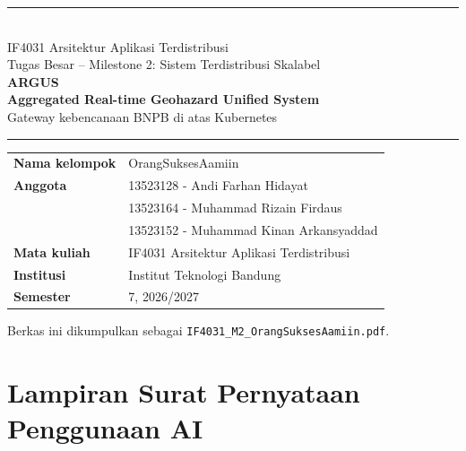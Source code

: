 \documentclass[11pt,a4paper,oneside]{report}
\begin{document}
\begin{titlepage}
\thispagestyle{empty}
\sffamily
\vspace*{1.2cm}
{\color{accent}\rule{\textwidth}{1.6pt}}\\[1.2em]
{\Large IF4031 Arsitektur Aplikasi Terdistribusi}\\[0.4em]
{\large Tugas Besar -- Milestone 2: Sistem Terdistribusi Skalabel}\\[2.2em]
{\fontsize{40}{44}\selectfont\bfseries\color{accent} ARGUS}\\[0.5em]
{\Large\bfseries Aggregated Real-time Geohazard Unified System}\\[0.8em]
{\large Gateway kebencanaan BNPB di atas Kubernetes}\\[1.2em]
{\color{accent}\rule{\textwidth}{0.6pt}}

\vspace{2.2cm}
\begin{tabular}{@{}L{3.6cm}L{10cm}@{}}
\textbf{Nama kelompok} & OrangSuksesAamiin\\[0.8em]
\textbf{Anggota} & 13523128 - Andi Farhan Hidayat\\
 & 13523164 - Muhammad Rizain Firdaus\\
 & 13523152 - Muhammad Kinan Arkansyaddad\\[0.8em]
\textbf{Mata kuliah} & IF4031 Arsitektur Aplikasi Terdistribusi\\
\textbf{Institusi} & Institut Teknologi Bandung\\
\textbf{Semester} & 7, 2026/2027
\end{tabular}

\vfill
{\small\color{gridgray}Berkas ini dikumpulkan sebagai \texttt{IF4031\_M2\_OrangSuksesAamiin.pdf}.}
\end{titlepage}
\tableofcontents
\clearpage
{}







\chapter{Lampiran Surat Pernyataan Penggunaan AI}

\end{document}
